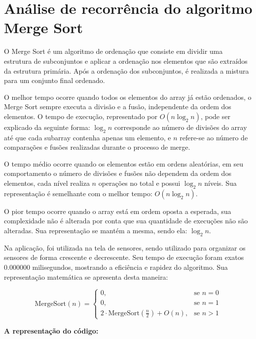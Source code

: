 \documentclass[
  a4paper,
  12pt,
  english,
  brazilian,
]{article}
\begin{document}
\section*{\textbf{Análise de recorrência do algoritmo Merge Sort}}

O Merge Sort é um algoritmo de ordenação que consiste em dividir uma estrutura de subconjuntos e aplicar a ordenação nos elementos que são extraídos da estrutura primária. Após a ordenação dos subconjuntos, é realizada a mistura para um conjunto final ordenado.

O melhor tempo ocorre quando todos os elementos do array já estão ordenados, o Merge Sort sempre executa a divisão e a fusão, independente  da ordem dos elementos. O tempo de execução, representado por \( O(n \log_2 n) \), pode ser explicado da seguinte forma: \( \log_2 n \) corresponde ao número de divisões do array até que cada subarray contenha apenas um elemento, e \( n \) refere-se ao número de comparações e fusões realizadas durante o processo de merge.

O tempo médio ocorre quando os elementos estão em ordens aleatórias, em seu comportamento o número de divisões e fusões não dependem da ordem dos elementos, cada nível realiza \( n \) operações no total e possui \( \log_2 n \) níveis. Sua representação é semelhante com o melhor tempo: \( O(n \log_2 n) \).

O pior tempo ocorre quando o array está em ordem oposta a esperada, sua complexidade não é alterada por conta que sua quantidade de execuções não são alteradas. Sua representação se mantém a mesma, sendo ela: \( \log_2 n \).

Na aplicação, foi utilizada na tela de sensores, sendo utilizado para organizar os sensores de forma crescente e decrescente. Seu tempo de execução foram exatos 0.000000 milisegundos, mostrando a eficiência e rapidez do algoritmo. Sua representação matemática se apresenta desta maneira:

\[
\text{MergeSort}(n) =
\begin{cases}
0, & \text{se } n = 0 \\
0, & \text{se } n = 1 \\
2 \cdot \text{MergeSort}\left(\frac{n}{2}\right) + O(n), & \text{se } n > 1
\end{cases}
\]

\textbf {A representação do código:} 
\end{document}

